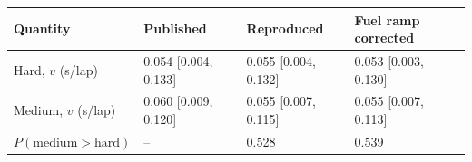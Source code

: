 \begin{tabular}{@{}llll@{}}
\toprule
Quantity & Published & Reproduced & Fuel ramp corrected \\
\midrule
Hard, $v$ (s/lap) & 0.054 [0.004, 0.133] & 0.055 [0.004, 0.132] & 0.053 [0.003, 0.130] \\
Medium, $v$ (s/lap) & 0.060 [0.009, 0.120] & 0.055 [0.007, 0.115] & 0.055 [0.007, 0.113] \\
$P(\mathrm{medium} > \mathrm{hard})$ & -- & 0.528 & 0.539 \\
\bottomrule
\end{tabular}
